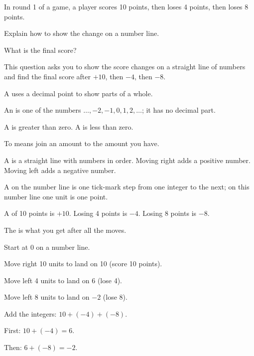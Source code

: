 In round 1 of a game, a player scores 10 points, then loses 4 points, then loses 8 points.

\par\noindent{}Explain how to show the change on a number line.
\par\noindent{}What is the final score?


This question asks you to show the score changes on a straight line of numbers and find the final score after $+10$, then $-4$, then $-8$.

\begin{words}
  \item A uses a decimal point to show parts of a whole.
  \item An is one of the numbers $\ldots, -2, -1, 0, 1, 2, \ldots$; it has no decimal part.
  \item A is greater than zero. A is less than zero.
  \item To means join an amount to the amount you have.
  \item A is a straight line with numbers in order. Moving right adds a positive number. Moving left adds a negative number.
  \item A on the number line is one tick-mark step from one integer to the next; on this number line one unit is one point.
  \item A of 10 points is $+10$. Losing 4 points is $-4$. Losing 8 points is $-8$.
  \item The is what you get after all the moves.
\end{words}

\begin{steps}
  \item {}Start at 0 on a number line.
  \item Move right 10 units to land on 10 (score 10 points).
  \item Move left 4 units to land on 6 (lose 4).
  \item Move left 8 units to land on $-2$ (lose 8).
  \item {}Add the integers: $10 + (-4) + (-8)$.
  \item First: $10 + (-4) = 6$.
  \item Then: $6 + (-8) = -2$.
\end{steps}

